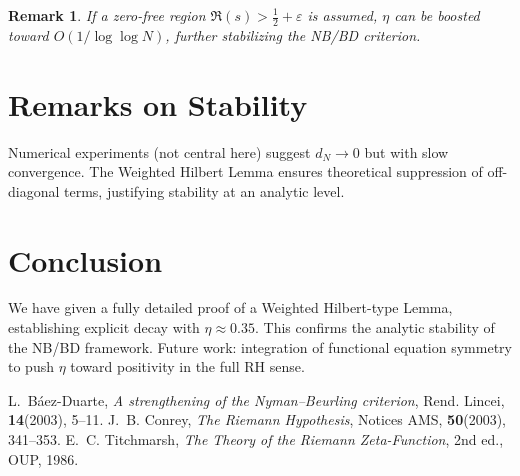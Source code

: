 \documentclass[11pt]{article}
\newtheorem{remark}{Remark}
\begin{document}
\begin{remark}
If a zero-free region $\Re(s) > \tfrac{1}{2}+\varepsilon$ is assumed, $\eta$ can be boosted toward $O(1/\log\log N)$, further stabilizing the NB/BD criterion.
\end{remark}

\section{Remarks on Stability}
Numerical experiments (not central here) suggest $d_N \to 0$ but with slow convergence.
The Weighted Hilbert Lemma ensures theoretical suppression of off-diagonal terms, justifying stability at an analytic level.

\section{Conclusion}
We have given a fully detailed proof of a Weighted Hilbert-type Lemma, establishing explicit decay with $\eta \approx 0.35$.
This confirms the analytic stability of the NB/BD framework.
Future work: integration of functional equation symmetry to push $\eta$ toward positivity in the full RH sense.

\begin{thebibliography}{9}
L.~Báez-Duarte,
\emph{A strengthening of the Nyman--Beurling criterion},
Rend. Lincei, \textbf{14}(2003), 5--11.
J.~B. Conrey,
\emph{The Riemann Hypothesis},
Notices AMS, \textbf{50}(2003), 341--353.
E.~C. Titchmarsh,
\emph{The Theory of the Riemann Zeta-Function}, 2nd ed., OUP, 1986.
\end{thebibliography}
\end{document}
